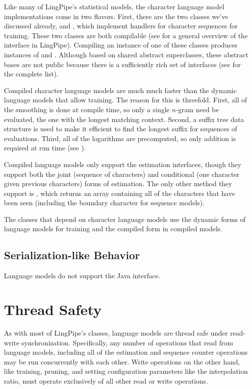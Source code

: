 Like many of LingPipe's statistical models, the character language
model implementations come in two flavors.  First, there are the two
classes we've discussed already,  and
, which implement handlers for character
sequences for training.  These two classes are both compilable (see
 for a general overview of the 
interface in LingPipe).  Compiling an instance of one of these classes
produces instances of  and
.  Although based on shared abstract
superclasses, these abstract bases are not public because there is a
sufficiently rich set of interfaces (see 
for the complete list).

Compiled character language models are much much faster than the
dynamic language models that allow training.  The reason for this is
threefold.  First, all of the smoothing is done at compile time, so
only a single $n$-gram need be evaluated, the one with the longest
matching context.  Second, a suffix tree data structure is used to
make it efficient to find the longest suffix for sequences of
evaluations.  Third, all of the logarithms are precomputed, so only
addition is required at run time (see ).  

Compiled language models only support the estimation interfaces,
though they support both the joint (sequence of characters) and
conditional (one character given previous characters) forms of
estimation.  The only other method they support is
, which returns an array containing all of
the characters that have been seen (including the boundary character
for sequence models).

The classes that depend on character language models use the dynamic
forms of language models for training and the compiled form in compiled
models.

\subsection{Serialization-like Behavior}

Language models do not support the Java 
interface.


\section{Thread Safety}

As with most of LingPipe's classes, language models are thread safe
under read-write synchronization.  Specifically, any number of
operations that read from language models, including all of the
estimation and sequence counter operations may be run concurrently
with each other. Write operations on the other hand, like training,
pruning, and setting configuration parameters like the interpolation
ratio, must operate exclusively of all other read or write operations.


